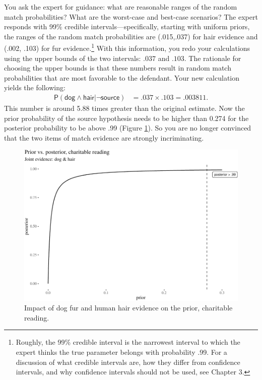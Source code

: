 \documentclass[
  10pt,
  dvipsnames,enabledeprecatedfontcommands]{scrartcl}
\newcommand{\s}[1]{\mbox{$\mathsf{#1}$}}
\begin{document}
You ask the expert for guidance: what are reasonable ranges of the
random match probabilities? What are the worst-case and best-case
scenarios? The expert responds with 99\% credible
intervals---specifically, starting with uniform priors, the ranges of
the random match probabilities are (.015,.037) for hair evidence and
(.002, .103) for fur evidence.\footnote{Roughly, the 99\% credible
  interval is the narrowest interval to which the expert thinks the true
  parameter belongs with probability .99. For a discussion of what
  credible intervals are, how they differ from confidence intervals, and
  why confidence intervals should not be used, see Chapter 3.} With this
information, you redo your calculations using the upper bounds of the
two intervals: \(.037\) and \(.103\). The rationale for choosing the
upper bounds is that these numbers result in random match probabilities
that are most favorable to the defendant. Your new calculation yields
the following: \begin{align*}
\mathsf{P}(\s{dog}\wedge \s{hair} \vert \neg \s{source})   & =  .037 \times .103 =.003811.
\end{align*} This number is around 5.88 times greater than the original
estimate. Now the prior probability of the source hypothesis needs to be
higher than 0.274 for the posterior probability to be above .99 (Figure
\ref{fig:impactOfCharitable}). So you are no longer convinced that the
two items of match evidence are strongly incriminating.

\begin{figure}[H]

\begin{center}\includegraphics[width=0.6\linewidth]{paper-outline_files/figure-latex/fig:charitableImpact7-1} \end{center}
\caption{Impact of dog fur and human hair evidence on the prior, charitable reading.}
\label{fig:impactOfCharitable}
\end{figure}
\end{document}
